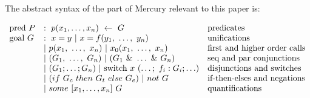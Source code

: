 
The abstract syntax of the part of Mercury relevant to this paper is:

$$
\begin{array}{lll}
\mbox{pred}~P
    & :~ p(x_1, \ldots, x_n)~\leftarrow~G
        & \hbox{predicates} \\
\mbox{goal}~G
    & :~ x = y ~|~ x = f(y_1,~\ldots,~y_n)
        & \hbox{unifications}\\
    & |~ p(x_1,~\ldots,~x_n) ~|~ x_0(x_1,~\ldots,~x_n)
        & \hbox{first and higher order calls} \\
    & |~ (G_1,~\ldots,~G_n) ~|~ (G_1~\&~\ldots~\&~G_n)
        & \hbox{seq and par conjunctions}\\
    & |~ (G_1 ; \ldots ; G_n) ~|~ \hbox{switch}~x~(\ldots;~f_i: G_i ; \ldots)
        & \hbox{disjunctions and switches}\\
    & |~ (if~G_c~then~G_t~else~G_e) ~|~ not~G
        & \hbox{if-then-elses and negations}\\
    & |~ some~[x_1,\ldots,x_n]~G
        & \hbox{quantifications}\\
\end{array}
$$
\label{fig:abstractsyntax}

